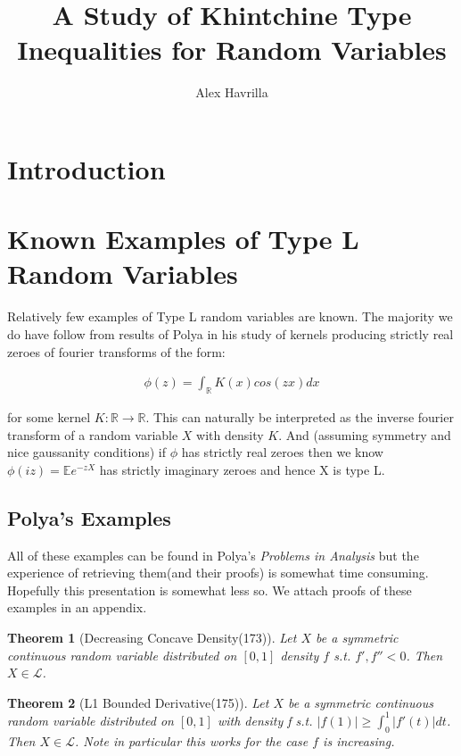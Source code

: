 \documentclass[10pt]{article}
\title{\vspace{-3em}A Study of Khintchine Type Inequalities for Random Variables}
\author{Alex Havrilla}
\newcommand{\E}{\mathbb{E}}
\newcommand{\1}{\textbf{1}}
\newcommand{\R}{\mathbb{R}}
\newcommand{\lL}{\mathcal{L}}
\newtheorem{theorem}{Theorem}
\theoremstyle{remark}
\theoremstyle{definition}
\begin{document}
\maketitle

\section{Introduction}

\section{Known Examples of Type L Random Variables}

Relatively few examples of Type L random variables are known. The majority we do have follow from results of Polya in his study of kernels producing strictly real zeroes of fourier transforms of the form:

\begin{align*}
	\phi(z) = \int_{\R} K(x)cos(zx)dx
\end{align*}

for some kernel $K : \R \to \R$. This can naturally be interpreted as the inverse fourier transform of a random variable $X$ with density $K$. And (assuming symmetry and nice gaussanity conditions) if $\phi$ has strictly real zeroes then we know $\phi(iz) = \E e^{-zX}$ has strictly imaginary zeroes and hence X is type L.

\subsection{Polya's Examples}

All of these examples can be found in Polya's \textit{Problems in Analysis} but the experience of retrieving them(and their proofs) is somewhat time consuming. Hopefully this presentation is somewhat less so. We attach proofs of these examples in an appendix. 

\begin{theorem}[Decreasing Concave Density(173)] \label{CCDNSTY}
	Let $X$ be a symmetric continuous random variable distributed on $[0,1]$ density $f$ s.t. $f',f'' < 0$. Then $X \in \lL$.
\end{theorem}

\begin{theorem}[L1 Bounded Derivative(175)] \label{LBDER}
	Let $X$ be a symmetric continuous random variable distributed on $[0,1]$ with density f s.t. $|f(1)| \geq \int_0^1 |f'(t)|dt$. Then $X \in \lL$. Note in particular this works for the case $f$ is increasing.
\end{theorem}
\end{document}
